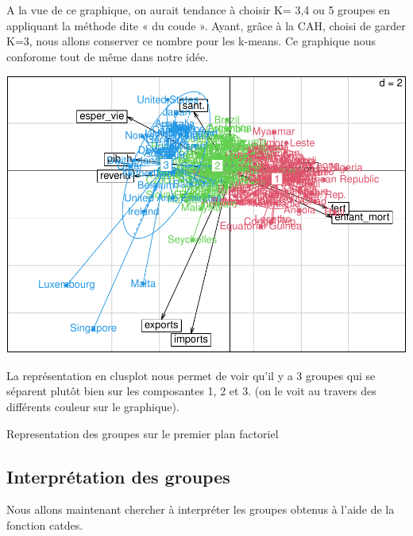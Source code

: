 \documentclass[
]{article}
\newenvironment{Shaded}{}{}
\newcommand{\AttributeTok}[1]{#1}
\newcommand{\DecValTok}[1]{#1}
\newcommand{\FunctionTok}[1]{#1}
\newcommand{\NormalTok}[1]{#1}
\newcommand{\OtherTok}[1]{\textcolor[rgb]{1.00,0.25,0.00}{#1}}
\newcommand{\SpecialCharTok}[1]{\textcolor[rgb]{0.00,0.50,0.50}{#1}}
\begin{document}
A la vue de ce graphique, on aurait tendance à choisir K= 3,4 ou 5
groupes en appliquant la méthode dite « du coude ». Ayant, grâce à la
CAH, choisi de garder K=3, nous allons conserver ce nombre pour les
k-means. Ce graphique nous conforome tout de même dans notre idée.

\begin{Shaded}
\end{Shaded}

\includegraphics{Projet_files/figure-latex/unnamed-chunk-25-1.pdf}

La représentation en clusplot nous permet de voir qu'il y a 3 groupes
qui se séparent plutôt bien sur les composantes 1, 2 et 3. (on le voit
au travers des différents couleur sur le graphique).

Representation des groupes sur le premier plan factoriel

\hypertarget{interpruxe9tation-des-groupes}{%
\subsection{Interprétation des
groupes}\label{interpruxe9tation-des-groupes}}

Nous allons maintenant chercher à interpréter les groupes obtenus à
l'aide de la fonction catdes.
\end{document}
